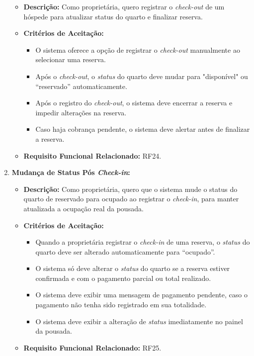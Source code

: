 \documentclass[
	12pt,				%
	openany,			%
	oneside,			%
	a4paper,			%
	english,			%
	french,				%
	spanish,			%
	brazil				%
	]{abntex2}
\begin{document}
\begin{enumerate}[label=\textbf{\arabic*.}]
	\begin{itemize}
		\item \textbf{Descrição:}  Como proprietária, quero registrar o \textit{check-out} de um hóspede para atualizar status do quarto e finalizar reserva.
		\item \textbf{Critérios de Aceitação:}
		\begin{itemize}
			\item O sistema oferece a opção de registrar o \textit{check-out} manualmente ao selecionar uma reserva.
			\item Após o \textit{check-out}, o \textit{status} do quarto deve mudar para "disponível" ou “reservado” automaticamente.
			\item Após o registro do \textit{check-out}, o sistema deve encerrar a reserva e impedir alterações na reserva.
			\item Caso haja cobrança pendente, o sistema deve alertar antes de finalizar a reserva.
		\end{itemize}
		\item \textbf{Requisito Funcional Relacionado:} RF24.
	\end{itemize} 
	\item \textbf{Mudança de Status Pós \textit{Check-in}:}
	\begin{itemize}
		\item \textbf{Descrição:} Como proprietária, quero que o sistema mude o status do quarto de reservado para ocupado ao registrar o \textit{check-in}, para manter atualizada a ocupação real da pousada.
		\item \textbf{Critérios de Aceitação:}
		\begin{itemize}
			\item Quando a proprietária registrar o \textit{check-in} de uma reserva, o \textit{status} do quarto deve ser alterado automaticamente para “ocupado”.
			\item O sistema só deve alterar o \textit{status} do quarto se a reserva estiver confirmada e com o pagamento parcial ou total realizado.
			\item O sistema deve exibir uma mensagem de pagamento pendente, caso o pagamento não tenha sido registrado em sua totalidade.
			\item O sistema deve exibir a alteração de \textit{status} imediatamente no painel da pousada.
		\end{itemize}
		\item \textbf{Requisito Funcional Relacionado:} RF25.
	\end{itemize} 

\end{enumerate}
\end{document}
